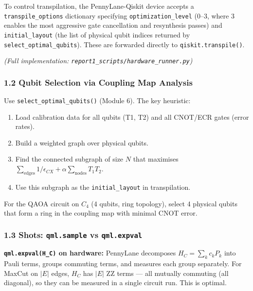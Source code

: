 \documentclass[
  11pt,
]{report}
\providecommand{\tightlist}{%
  \setlength{\itemsep}{0pt}\setlength{\parskip}{0pt}}
\begin{document}
To control transpilation, the PennyLane-Qiskit device accepts a
\texttt{transpile\_options} dictionary specifying
\texttt{optimization\_level} (0--3, where 3 enables the most aggressive
gate cancellation and resynthesis passes) and \texttt{initial\_layout}
(the list of physical qubit indices returned by
\texttt{select\_optimal\_qubits}). These are forwarded directly to
\texttt{qiskit.transpile()}.

\emph{(Full implementation:
\texttt{report1\_scripts/hardware\_runner.py})}

\subsubsection{1.2 Qubit Selection via Coupling Map
Analysis}\label{qubit-selection-via-coupling-map-analysis}

Use \texttt{select\_optimal\_qubits()} (Module 6). The key heuristic:

\begin{enumerate}
\def\labelenumi{\arabic{enumi}.}
\tightlist
\item
  Load calibration data for all qubits (T1, T2) and all CNOT/ECR gates
  (error rates).
\item
  Build a weighted graph over physical qubits.
\item
  Find the connected subgraph of size \(N\) that maximises
  \(\sum_{\text{edges}} 1/\epsilon_{CX} + \alpha \sum_{\text{nodes}} T_1 T_2\).
\item
  Use this subgraph as the \texttt{initial\_layout} in transpilation.
\end{enumerate}

For the QAOA circuit on \(C_4\) (4 qubits, ring topology), select 4
physical qubits that form a ring in the coupling map with minimal CNOT
error.

\subsubsection{\texorpdfstring{1.3 Shots: \texttt{qml.sample} vs
\texttt{qml.expval}}{1.3 Shots: qml.sample vs qml.expval}}\label{shots-qml.sample-vs-qml.expval}

\textbf{\texttt{qml.expval(H\_C)} on hardware:} PennyLane decomposes
\(H_C = \sum_k c_k P_k\) into Pauli terms, groups commuting terms, and
measures each group separately. For MaxCut on \(|E|\) edges, \(H_C\) has
\(|E|\) ZZ terms --- all mutually commuting (all diagonal), so they can
be measured in a single circuit run. This is optimal.
\end{document}
